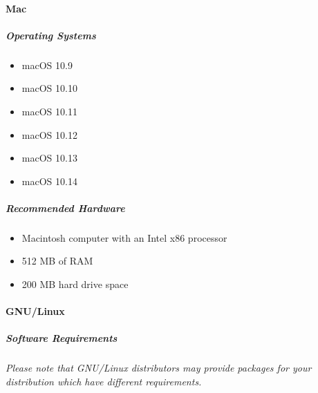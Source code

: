 \documentclass[]{article}
\let\oldparagraph\paragraph
\renewcommand{\paragraph}[1]{\oldparagraph{#1}\mbox{}}
\let\oldsubparagraph\subparagraph
\renewcommand{\subparagraph}[1]{\oldsubparagraph{#1}\mbox{}}
\begin{document}
\hypertarget{mac}{%
\paragraph{Mac}\label{mac}}

\hypertarget{operating-systems}{%
\subparagraph{Operating Systems}\label{operating-systems}}

\begin{itemize}
\item
  macOS 10.9
\item
  macOS 10.10
\item
  macOS 10.11
\item
  macOS 10.12
\item
  macOS 10.13
\item
  macOS 10.14
\end{itemize}

\hypertarget{recommended-hardware_1}{%
\subparagraph{Recommended Hardware}\label{recommended-hardware_1}}

\begin{itemize}
\item
  Macintosh computer with an Intel x86 processor
\item
  512 MB of RAM
\item
  200 MB hard drive space
\end{itemize}

\hypertarget{gnulinux}{%
\paragraph{GNU/Linux}\label{gnulinux}}

\hypertarget{software-requirements}{%
\subparagraph{Software Requirements}\label{software-requirements}}

\emph{Please note that GNU/Linux distributors may provide packages for
your distribution which have different requirements.}
\end{document}
